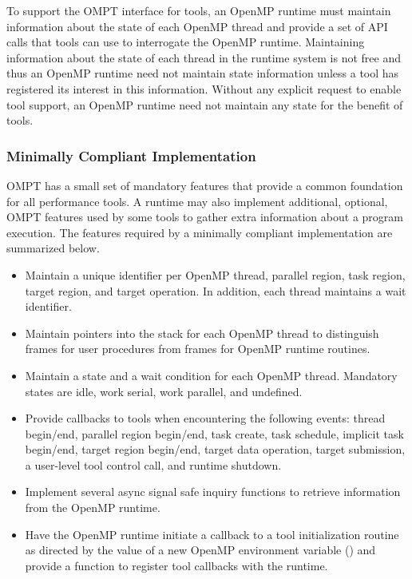 \documentclass{article}
\begin{document}
To support the OMPT interface for tools, an OpenMP runtime must maintain information about the state of each OpenMP thread and provide a set of API calls that tools can use to interrogate the OpenMP runtime. Maintaining information about the state of each thread in the runtime system is not free and thus an OpenMP runtime need not maintain state information unless a tool has registered its interest in this information.
Without any explicit request to enable tool support, an OpenMP runtime need not maintain any state for the benefit of tools.

\subsubsection{Minimally Compliant Implementation}

OMPT has a small set of mandatory features that provide a common foundation for all performance tools. A runtime may also implement additional, optional, OMPT features used by some tools to gather extra information about a program execution.     
The features required by a minimally compliant implementation are summarized below.

\begin{itemize}
\item Maintain a unique identifier per OpenMP thread, parallel region, task region, target region, and target operation. In addition, each thread maintains a wait identifier.
\item Maintain pointers into the stack for each OpenMP thread to distinguish frames for user procedures from frames for OpenMP runtime routines.  
\item Maintain a state and a wait condition for each OpenMP thread. Mandatory states are idle, work serial, work parallel, and undefined.
\item Provide callbacks to tools when encountering the following  events:  thread begin/end, parallel region begin/end, task create, task schedule, implicit task begin/end, target region begin/end, target data operation, target submission, a user-level tool control call, and runtime shutdown.
\item Implement several async signal safe inquiry functions to retrieve information from the OpenMP runtime.
\item Have the OpenMP runtime initiate a callback to a tool initialization routine 
as directed by the value of a new OpenMP environment variable () and provide a function to register tool callbacks with the runtime.
\end{itemize}
\end{document}
